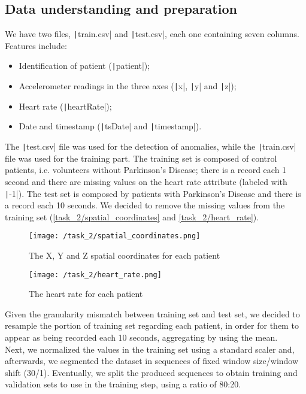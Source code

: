 \documentclass[12pt,a4paper,leqno]{article}
\begin{document}
	\subsection{Data understanding and preparation}
	We have two files, \texttt|train.csv| and \texttt|test.csv|, each one containing seven columns. Features include:
	\begin{itemize}
		\item Identification of patient (\texttt|patient|);
		\item Accelerometer readings in the three axes (\texttt|x|, \texttt|y| and \texttt|z|);
		\item Heart rate (\texttt|heartRate|);
		\item Date and timestamp (\texttt|tsDate| and \texttt|timestamp|).
	\end{itemize}
	The \texttt|test.csv| file was used for the detection of anomalies, while the \texttt|train.csv| file was used for the training part. The training set is composed of control patients, i.e. volunteers without Parkinson’s Disease; there is a record each 1 second and there are missing values on the heart rate attribute (labeled with \texttt|-1|). The test set is composed by patients with Parkinson’s Disease and there is a record each 10 seconds. We decided to remove the missing values from the training set (\autoref{task_2/spatial_coordinates} and \autoref{task_2/heart_rate}).
	\begin{figure}
		\centering
		\texttt{[image: /task\_2/spatial\_coordinates.png]}
		\caption{The X, Y and Z spatial coordinates for each patient}
		\label{task_2/spatial_coordinates}
	\end{figure}
	\begin{figure}
		\centering
		\texttt{[image: /task\_2/heart\_rate.png]}
		\caption{The heart rate for each patient}
		\label{task_2/heart_rate}
	\end{figure}
	Given the granularity mismatch between training set and test set, we decided to resample the portion of training set regarding each patient, in order for them to appear as being recorded each 10 seconds, aggregating by using the mean.\\
	Next, we normalized the values in the training set using a standard scaler and, afterwards, we segmented the dataset in sequences of fixed window size/window shift (30/1). Eventually, we split the produced sequences to obtain training and validation sets to use in the training step, using a ratio of 80:20.
	
\end{document}
